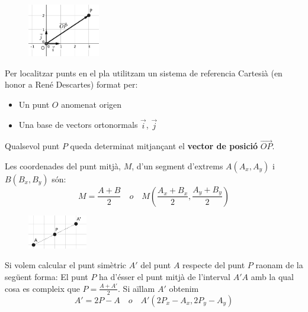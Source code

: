 \begin{theorybox}
	 \begin{figure} 
		\vspace{-0.5cm}
		\begin{center}
			\includegraphics[width=0.28\textwidth]{img-09/cartesian}
		\end{center}
	\end{figure}
	Per localitzar punts en el pla utilitzam un sistema de referencia Cartesià (en honor a René Descartes) format per:
	\begin{itemize}
		\item Un punt $O$ anomenat origen
		\item Una base de vectors ortonormals $\vec i$, $\vec j$
	\end{itemize}
	Qualsevol punt $P$ queda determinat mitjançant el \textbf{vector de posició} $\overrightarrow{OP}$.
\end{theorybox}

\pagebreak

\begin{theorybox}
 	Les coordenades del punt mitjà, $M$, d'un segment d'extrems $A(A_x, A_y)$ i $B(B_x, B_y)$ són:
	\begin{equation}
	M=\frac{A+B}{2} \,\,\,\,\,\, o \,\,\,\,\,\, M \left( \frac{A_x+B_x}{2},  \frac{A_y+B_y}{2} \right)
	\end{equation}
	
\end{theorybox}


\begin{theorybox}
	\begin{figure} 
		\vspace{-0.5cm}
		\begin{center}
			\includegraphics[width=0.23\textwidth]{img-09/simetric}
		\end{center}
	\end{figure}
	Si volem calcular el punt simètric $A'$ del punt $A$ respecte del punt $P$ raonam de la següent forma:
	El punt $P$ ha d'ésser el punt mitjà de l'interval $A'A$ amb la qual cosa es compleix que  $P = \frac{A+A'}{2}$. Si aïllam $A'$ obtenim 
	\begin{equation*}
	A' = 2P-A \,\,\,\,\,\, o \,\,\,\,\,\,A' \left( 2P_x-A_x,  2P_y-A_y \right)
	\end{equation*}
	
\end{theorybox}



